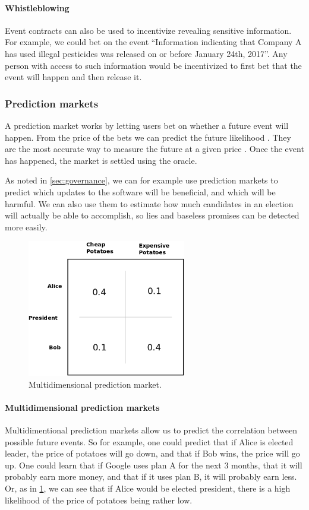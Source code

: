 \documentclass[a4paper, 10pt, conference]{ieeeconf}      %
\begin{document}
\begin{draft}
\paragraph{Whistleblowing}
Event contracts can also be used to incentivize revealing sensitive information. For example, we could bet on the event ``Information indicating that Company A has used illegal pesticides was released on or before January 24th, 2017''. Any person with access to such information would be incentivized to first bet that the event will happen and then release it.

\subsubsection{Prediction markets}
A prediction market works by letting users bet on whether a future event will happen. From the price of the bets we can predict the future likelihood \cite{hivemind,augur,promisepredmarket}. They are the most accurate way to measure the future at a given price \source. Once the event has happened, the market is settled using the oracle.

As noted in \cref{sec:governance}, we can for example use prediction markets to predict which updates to the software will be beneficial, and which will be harmful. We can also use them to estimate how much candidates in an election will actually be able to accomplish, so lies and baseless promises can be detected more easily. 

\begin{figure}[htpb]
    \centering    \includegraphics[width=\textwidth,height=6cm,keepaspectratio=true]{img/multidim-predictionmarket.png}
    \caption{Multidimensional prediction market.}
    \label{fig:potato}
\end{figure}

\paragraph{Multidimensional prediction markets}
Multidimentional prediction markets allow us to predict the correlation between possible future events.
So for example, one could predict that if Alice is elected leader, the price of potatoes will go down, and that if Bob wins, the price will go up. One could learn that if Google uses plan A for the next 3 months, that it will probably earn more money, and that if it uses plan B, it will probably earn less. Or, as in \cref{fig:potato}, we can see that if Alice would be elected president, there is a high likelihood of the price of potatoes being rather low.

\end{draft}
\end{document}
